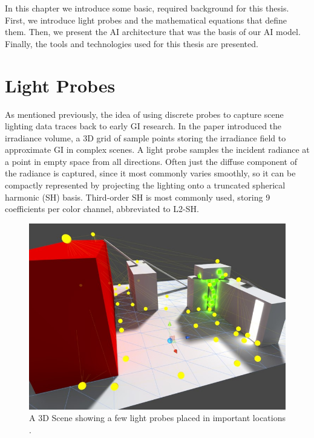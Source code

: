 In this chapter we introduce some basic, required background for this thesis. First, we introduce light probes and the mathematical equations that define them. Then, we present the AI architecture that was the basis of our AI model. Finally, the tools and technologies used for this thesis are presented.

\section{Light Probes}
As mentioned previously, the idea of using discrete probes to capture scene lighting data traces back to early GI research. In the paper \parencite{Greger1998} introduced the irradiance volume, a 3D grid of sample points storing the irradiance field to approximate GI in complex scenes. A light probe samples the incident radiance at a point in empty space from all directions. Often just the diffuse component of the radiance is captured, since it most commonly varies smoothly, so it can be compactly represented by projecting the lighting onto a truncated spherical harmonic (SH) basis. Third-order SH is most commonly used, storing 9 coefficients per color channel, abbreviated to L2-SH.

\begin{figure}[h]
	\centering
	\includegraphics[scale=0.5]{Graphics/light_probes.jpg}
	\caption{A 3D Scene showing a few light probes placed in important locations \parencite{Unity2016}.}
	\label{fig:Light_probes}
\end{figure}


